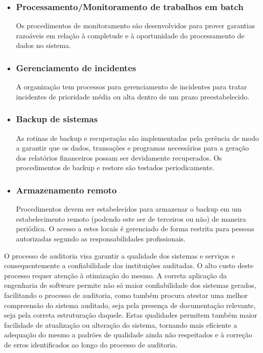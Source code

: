 \begin{itemize}
\item	\subsubsection{ Processamento/Monitoramento de trabalhos em batch}

	Os procedimentos de monitoramento são desenvolvidos para prover garantias razoáveis em relação à completude e à oportunidade do processamento de dados no sistema.

\item	\subsubsection{Gerenciamento de incidentes}

	A organização tem processos para gerenciamento de incidentes para tratar incidentes de prioridade média ou alta dentro de um prazo preestabelecido.
	
\item	\subsubsection{Backup de sistemas}
	
	As rotinas de backup e recuperação são implementadas pela gerência de modo a garantir que os dados, transações e programas necessários para a geração dos relatórios financeiros possam ser devidamente recuperados. Os procedimentos de backup e restore são testados periodicamente.
	
\item	\subsubsection{Armazenamento remoto}
	
	Procedimentos devem ser estabelecidos para armazenar o backup em um estabelecimento remoto (podendo este ser de terceiros ou não) de maneira periódica. O acesso a estes locais é gerenciado de forma restrita para pessoas autorizadas segundo as responsabilidades profissionais.
\end{itemize}

O processo de auditoria visa garantir a qualidade dos sistemas e serviços e consequentemente a confiabilidade das instituições auditadas. O alto custo deste processo requer atenção à otimização do mesmo. A correta aplicação da engenharia de software permite não só maior confiabilidade dos sistemas gerados, facilitando o processo de auditoria, como também procura atestar uma melhor compreensão do sistema auditado, seja pela presença de documentação relevante, seja pela correta estruturação daquele. Estas qualidades permitem também maior facilidade de atualização ou alteração do sistema, tornando mais eficiente a adequação do mesmo a padrões de qualidade ainda não respeitados e à correção de erros identificados ao longo do processo de auditoria.
	
